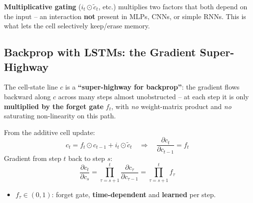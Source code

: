 \documentclass[10pt,a4paper]{article}
\begin{document}
	\begin{importantbox}
		\textbf{Multiplicative gating} ($i_t\odot\tilde c_t$, etc.) multiplies two factors that both depend on the input -- an interaction \textbf{not} present in MLPs, CNNs, or simple RNNs. This is what lets the cell selectively keep/erase memory.
	\end{importantbox}

	\subsection{Backprop with LSTMs: the Gradient Super-Highway}

	\begin{definitionbox}
		The cell-state line $c$ is a \textbf{``super-highway for backprop''}: the gradient flows backward along $c$ across many steps almost unobstructed -- at each step it is only \textbf{multiplied by the forget gate} $f_t$, with \emph{no} weight-matrix product and \emph{no} saturating non-linearity on this path.
	\end{definitionbox}

	\begin{formulabox}
		From the additive cell update:
		\[
		c_t = f_t \odot c_{t-1} + i_t \odot \tilde c_t
		\quad\Longrightarrow\quad
		\frac{\partial c_t}{\partial c_{t-1}} = f_t
		\]
		Gradient from step $t$ back to step $s$:
		\[
		\frac{\partial c_t}{\partial c_s}
		= \prod_{\tau=s+1}^{t} \frac{\partial c_\tau}{\partial c_{\tau-1}}
		= \prod_{\tau=s+1}^{t} f_\tau
		\]
	\end{formulabox}
	\begin{itemize}[leftmargin=*]
		\item $f_\tau \in (0,1)$: forget gate, \textbf{time-dependent} and \textbf{learned} per step.
	\end{itemize}
\end{document}
